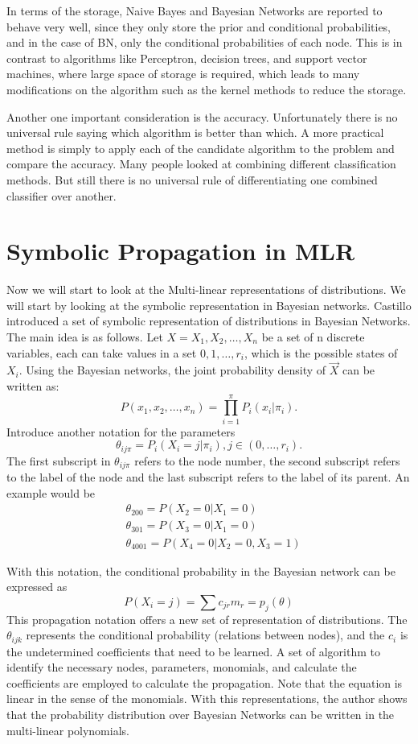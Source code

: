 \documentclass[11pt]{article}
\begin{document}
In terms of the storage, Naive Bayes and Bayesian Networks are reported to behave very well, since they only store the prior and conditional probabilities, and in the case of BN, only the conditional probabilities of each node. This is in contrast to algorithms like Perceptron, decision trees, and support vector machines, where large space of storage is required, which leads to many modifications on the algorithm such as the kernel methods to reduce the storage. 

Another one important consideration is the accuracy. Unfortunately there is no universal rule saying which algorithm is better than which. A more practical method is simply to apply each of the candidate algorithm to the problem and compare the accuracy.\cite{dietterich1998approximate}\cite{vilalta2002perspective} Many people looked at combining different classification methods. But still there is no universal rule of differentiating one combined classifier over another. 
\section{Symbolic Propagation in MLR}
Now we will start to look at the Multi-linear representations of distributions. We will start by looking at the symbolic representation in Bayesian networks. Castillo introduced a set of symbolic representation of distributions in Bayesian Networks\cite{castillo1996goal}. The main idea is as follows. Let $X={X_1,X_2,\ldots,X_n}$ be a set of n discrete variables, each can take values in a set ${0,1,\ldots,r_i}$, which is the possible states of $X_i$. Using the Bayesian networks, the joint probability density of $\vec{X}$ can be written as: 
\[P(x_1,x_2,\ldots,x_n)=\prod\limits_{i=1}^{\pi}P_i(x_i|\pi_i).\]
Introduce another notation for the parameters
\[\theta_{ij\pi}=P_i(X_i=j|\pi_i),j\in{(0,\ldots,r_i)}.\]
The first subscript in $\theta_{ij\pi}$ refers to the node number, the second subscript refers to the label of the node and the last subscript refers to the label of its parent. An example would be 
\begin{align*}
& \theta_{200}=P(X_2=0|X_1=0) \\
& \theta_{301}=P(X_3=0|X_1=0) \\
& \theta_{4001}=P(X_4=0|X_2=0,X_3=1)
\end{align*}

With this notation, the conditional probability in the Bayesian network can be expressed as 
\begin{equation}
P(X_i=j)=\sum c_{jr}m_r=p_j(\theta)
\end{equation}
This propagation notation offers a new set of representation of distributions. The $\theta_{ijk}$ represents the conditional probability (relations between nodes), and the $c_i$ is the undetermined coefficients that need to be learned. A set of algorithm to identify the necessary nodes, parameters, monomials, and calculate the coefficients are employed to calculate the propagation. Note that the equation is linear in the sense of the monomials. With this representations, the author shows that the probability distribution over Bayesian Networks can be written in the multi-linear polynomials.
\end{document}
